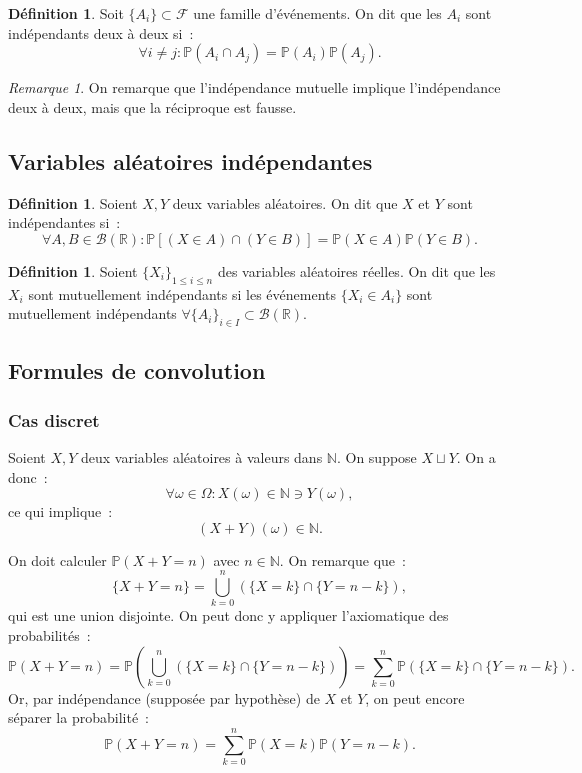 \documentclass{article}
\newcommand{\N}{\mathbb N}
\renewcommand{\P}{\mathbb P}
\newcommand{\R}{\mathbb R}
\theoremstyle{definition}
\newtheorem{déf}[thm]{Définition}
\theoremstyle{remark}
\newtheorem*{rmq}{Remarque}
\begin{document}
		\begin{déf} Soit $\{A_i\} \subset \mathcal F$ une famille d'événements. On dit que les $A_i$ sont indépendants deux à deux si~:
		\[\forall i \neq j : \P(A_i \cap A_j) = \P(A_i)\P(A_j).\]
		\end{déf}

		\begin{rmq} On remarque que l'indépendance mutuelle implique l'indépendance deux à deux, mais que la réciproque est fausse. \end{rmq}

	\subsection{Variables aléatoires indépendantes}
		\begin{déf} Soient $X, Y$ deux variables aléatoires. On dit que $X$ et $Y$ sont indépendantes si~:
		\[\forall A, B \in \mathcal B(\R) : \P\left[(X \in A) \cap (Y \in B)\right] = \P(X \in A)\P(Y \in B).\]
		\end{déf}

		\begin{déf} Soient $\{X_i\}_{1 \leq i \leq n}$ des variables aléatoires réelles. On dit que les $X_i$ sont mutuellement indépendants si les événements
		$\{X_i \in A_i\}$ sont mutuellement indépendants $\forall \{A_i\}_{i \in I} \subset \mathcal B(\R)$. \end{déf}

	\subsection{Formules de convolution}
		\subsubsection{Cas discret}
		Soient $X, Y$ deux variables aléatoires à valeurs dans $\N$. On suppose $X \sqcup Y$. On a donc~:
		\[\forall \omega \in \Omega : X(\omega) \in \N \ni Y(\omega),\]
		ce qui implique~:
		\[(X+Y)(\omega) \in \N.\]

		On doit calculer $\P(X+Y = n)$ avec $n \in \N$. On remarque que~:
		\[\{X+Y = n\} = \bigcup_{k=0}^n\left(\{X = k\} \cap \{Y = n-k\}\right),\]
		qui est une union disjointe. On peut donc y appliquer l'axiomatique des probabilités~:
		\[\P(X+Y = n) = \P\left(\bigcup_{k=0}^n\left(\{X=k\} \cap \{Y = n-k\}\right)\right) = \sum_{k=0}^n\P(\{X = k\} \cap \{Y = n-k\}).\]
		Or, par indépendance (supposée par hypothèse) de $X$ et $Y$, on peut encore séparer la probabilité~:
		\[\P(X+Y = n) = \sum_{k=0}^n\P(X=k)\P(Y=n-k).\]
\end{document}
